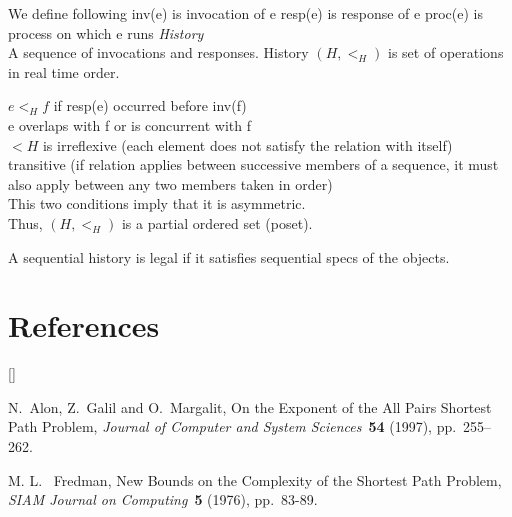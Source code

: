\documentclass[twoside]{article}
\def\beginrefs{\begin{list}%
        {[\arabic{equation}]}{\usecounter{equation}
         \setlength{\leftmargin}{2.0truecm}\setlength{\labelsep}{0.4truecm}%
         \setlength{\labelwidth}{1.6truecm}}}
\def\endrefs{\end{list}}
\def\bibentry#1{\item[\hbox{[#1]}]}
\begin{document}
We define following
	inv(e) is invocation of e
	resp(e) is response of e
	proc(e) is process on which e runs
{\em History\\}
A sequence of invocations and responses.	
History  $(H, <_H)$ is set of operations in real time order.

$e<_Hf$ if resp(e) occurred before inv(f)\\

e overlaps with f or is concurrent with f\\

$<{H}$ is irreflexive (each element does not satisfy the relation with itself)\\ 
		transitive (if relation applies between successive members of a sequence, it must also apply between any two members taken in order)\\
This two conditions imply that it is asymmetric.\\
Thus, $(H, <_H)$ is a partial ordered set (poset).

A sequential history is legal if it satisfies sequential specs of the objects.

\section*{References}
\beginrefs
\bibentry{AGM97}{\sc N.~Alon}, {\sc Z.~Galil} and {\sc O.~Margalit},
On the Exponent of the All Pairs Shortest Path Problem,
{\it Journal of Computer and System Sciences\/}~{\bf 54} (1997),
pp.~255--262.

\bibentry{F76}{\sc M. L. ~Fredman}, New Bounds on the Complexity of the 
Shortest Path Problem, {\it SIAM Journal on Computing\/}~{\bf 5} (1976), 
pp.~83-89.
\endrefs
\end{document}
